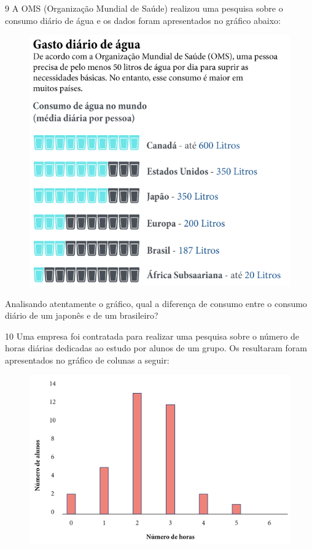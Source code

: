 \num{9} A OMS (Organização Mundial de Saúde) realizou uma pesquisa sobre o
consumo diário de água e os dados foram apresentados no gráfico abaixo:

\begin{figure}[htpb!]
\includegraphics[width=\textwidth]{../ilustracoes/MAT5/SAEB_5ANO_MAT_figura108.png}
\end{figure}

Analisando atentamente o gráfico, qual a diferença de consumo entre o
consumo diário de um japonês e de um brasileiro?


\pagebreak
\num{10} Uma empresa foi contratada para realizar uma pesquisa sobre o
número de horas diárias dedicadas ao estudo por alunos de um grupo.
Os resultaram foram apresentados no gráfico de colunas a seguir:

\begin{figure}[htpb!]
\includegraphics[width=\textwidth]{../ilustracoes/MAT5/SAEB_5ANO_MAT_figura109.png}
\end{figure}

